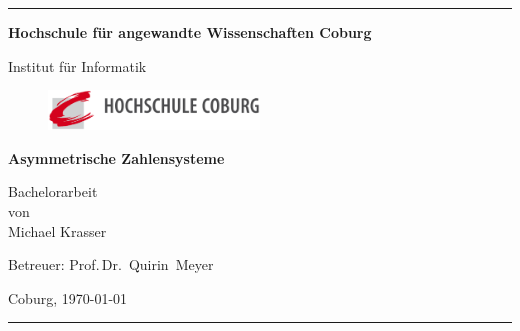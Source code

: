 \documentclass[a4paper,12pt]{article}
\begin{document}
\begin{titlepage}
\thispagestyle{empty} \enlargethispage{1.4in}

\begin{center}

\rule[1ex]{157.5mm}{0.5mm}

\LARGE\bf Hochschule für angewandte Wissenschaften Coburg\\

\vfill

\rm Institut für Informatik


\begin{figure}
	    \centering
				     \includegraphics[width=0.5\textwidth]{Logo.png}
\end{figure}

\vfill

\Huge \bf Asymmetrische Zahlensysteme

\vfill

\Large Bachelorarbeit \\ [1ex] von \\ [1ex]
Michael Krasser

\vfill

Betreuer:  Prof.\,Dr.~Quirin~Meyer

\vfill

Coburg, \today

\rule[-1ex]{157.5mm}{0.5mm}

\vfill

\end{center}

\end{titlepage}

\newpage
\tableofcontents
\pagebreak
\end{document}
